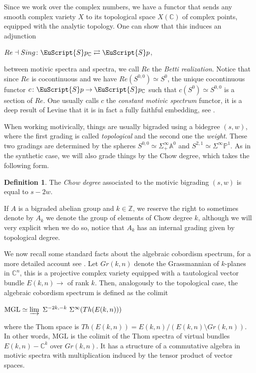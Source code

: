 \documentclass[oneside,a4paper]{amsart}
\newcommand{\euscr}[1]{\EuScript{#1}} %
\newcommand{\MGL}{\mathrm{MGL}} %
\newcommand{\spectra}{\euscr{S}p} %
\newcommand{\sigmainfty}{\Sigma^{\infty}_{+}} %
\theoremstyle{plain}
\theoremstyle{definition}
\newtheorem{defin}[thm]{Definition}
\theoremstyle{remark}
\begin{document}
Since we work over the complex numbers, we have a functor that sends any smooth complex variety $X$ to its topological space $X(\mathbb{C})$ of complex points, equipped with the analytic topology. One can show that this induces an adjunction

\begin{center}
$Re \dashv Sing \colon \spectra_{\mathbb{C}} \rightleftarrows \spectra$, 
\end{center}
between motivic spectra and spectra, we call $Re$ the \emph{Betti realization}. Notice that since $Re$ is cocontinuous and we have $Re(S^{0, 0}) \simeq S^{0}$, the unique cocontinuous functor $c \colon \spectra \rightarrow \spectra_{\mathbb{C}}$ such that $c(S^{0}) \simeq S^{0, 0}$ is a section of $Re$. One usually calls $c$ the \emph{constant motivic spectrum} functor, it is a deep result of Levine that it is in fact a fully faithful embedding, see \cite{levine2014comparison}.

When working motivically, things are usually bigraded using a bidegree $(s, w)$, where the first grading is called \emph{topological} and the second one the \emph{weight}. These two gradings are determined by the spheres $S^{0, 0} \simeq \sigmainfty \mathbb{A}^{0}$ and $S^{2, 1} \simeq \Sigma^{\infty} \mathbb{P}^{1}$. As in the synthetic case, we will also grade things by the Chow degree, which takes the following form. 

\begin{defin} 
The \emph{Chow degree} associated to the motivic bigrading $(s, w)$ is equal to $s - 2w$. 
\end{defin}
If $A$ is a bigraded abelian group and $k \in \mathbb{Z}$, we reserve the right to sometimes denote by $A_{k}$ we denote the group of elements of Chow degree $k$, although we will very explicit when we do so, notice that $A_{k}$ has an internal grading given by topological degree.

We now recall some standard facts about the algebraic cobordism spectrum, for a more detailed account see \cite{naumann2009motivic}. Let $Gr(k, n)$ denote the Grassmannian of $k$-planes in $\mathbb{C}^{n}$, this is a projective complex variety equipped with a tautological vector bundle $E(k, n) \rightarrow $ of rank $k$. Then, analogously to the topological case, the algebraic cobordism spectrum is defined as the colimit 

\begin{center}
$\MGL \simeq \varinjlim \ \Sigma^{-2k, -k} \ \Sigma^{\infty} (Th(E(k, n)))$
\end{center}
where the Thom space is $Th(E(k, n)) = E(k, n) / (E(k, n) \setminus Gr(k, n))$. In other words, $\MGL$ is the colimit of the Thom spectra of virtual bundles $E(k, n) - \mathbb{C}^{k}$ over $Gr(k ,n)$. It has a structure of a commutative algebra in motivic spectra with multiplication induced by the tensor product of vector spaces. 
\end{document}
